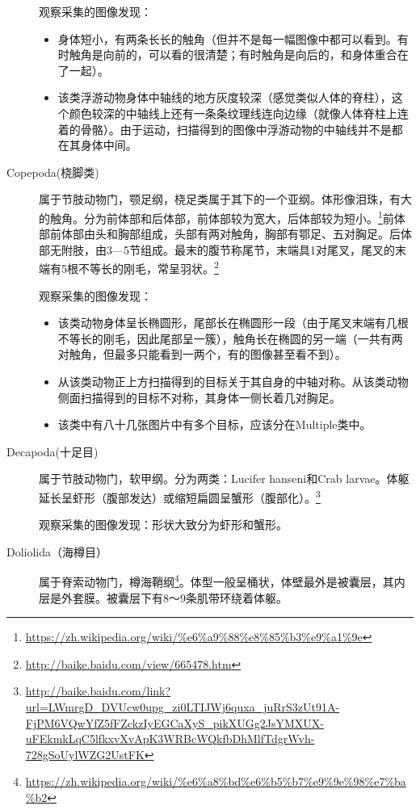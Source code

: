 \begin{description}
    观察采集的图像发现：
    \begin{itemize}
    \item 身体短小，有两条长长的触角（但并不是每一幅图像中都可以看到。有时触角是向前的，可以看的很清楚；有时触角是向后的，和身体重合在了一起）。
    \item 该类浮游动物身体中轴线的地方灰度较深（感觉类似人体的脊柱），这个颜色较深的中轴线上还有一条条纹理线连向边缘（就像人体脊柱上连着的骨骼）。由于运动，扫描得到的图像中浮游动物的中轴线并不是都在其身体中间。
    \end{itemize}
    \item[Copepoda(桡脚类)] 属于节肢动物门，颚足纲，桡足类属于其下的一个亚纲。体形像泪珠，有大的触角。分为前体部和后体部，前体部较为宽大，后体部较为短小。\footnote{\url{https://zh.wikipedia.org/wiki/\%e6\%a9\%88\%e8\%85\%b3\%e9\%a1\%9e}}前体部前体部由头和胸部组成，头部有两对触角，胸部有鄂足、五对胸足。后体部无附肢，由3—5节组成。最末的腹节称尾节，末端具1对尾叉，尾叉的末端有5根不等长的刚毛，常呈羽状。\footnote{\url{http://baike.baidu.com/view/665478.htm}}
    
    观察采集的图像发现：
    \begin{itemize}
    \item 该类动物身体呈长椭圆形，尾部长在椭圆形一段（由于尾叉末端有几根不等长的刚毛，因此尾部呈一簇），触角长在椭圆的另一端（一共有两对触角，但最多只能看到一两个，有的图像甚至看不到）。
    \item 从该类动物正上方扫描得到的目标关于其自身的中轴对称。从该类动物侧面扫描得到的目标不对称，其身体一侧长着几对胸足。
    \item {\color{blue}该类中有八十几张图片中有多个目标，应该分在Multiple类中。}
    \end{itemize}
    
    \item[{\color{blue}Decapoda(十足目)}] 属于节肢动物门，软甲纲。分为两类：Lucifer hanseni和Crab larvae。体躯延长呈虾形（腹部发达）或缩短扁圆呈蟹形（腹部化）。\footnote{\url{http://baike.baidu.com/link?url=LWmrgD_DVUcw0upg_zi0LTIJWj6quxa_juRrS3zUt91A-FjPM6VQwYfZ5fFZckzIyEGCaXyS_pikXUGg2JsYMXUX-uFEkmkLqC5lfkxvXvApK3WRBcWQkfbDhMlfTdgrWvh-728gSoUylWZG2UstFK}}
    
    观察采集的图像发现：形状大致分为虾形和蟹形。
    \item[Doliolida（海樽目）] 属于脊索动物门，樽海鞘纲\footnote{\url{https://zh.wikipedia.org/wiki/\%e6\%a8\%bd\%e6\%b5\%b7\%e9\%9e\%98\%e7\%ba\%b2}}。体型一般呈桶状，体壁最外是被囊层，其内层是外套膜。被囊层下有8～9条肌带环绕着体躯。
    

\end{description}
